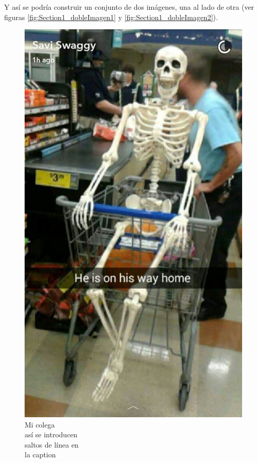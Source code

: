 \documentclass{article}
\begin{document}
Y así se podría construir un conjunto de dos imágenes, una al lado de otra (ver figuras \ref{fig:Section1_dobleImagen1} y \ref{fig:Section1_dobleImagen2}).

\begin{figure}[H]
\centering
    \begin{minipage}{.4\textwidth}
        \centering
        \includegraphics[width=0.95\linewidth]{Images/Section1/doble_imagen1.jpg}
        \caption{Mi colega \\ así se introducen \\ saltos de línea en \\ la caption}

\end{minipage}
\end{figure}
\end{document}
